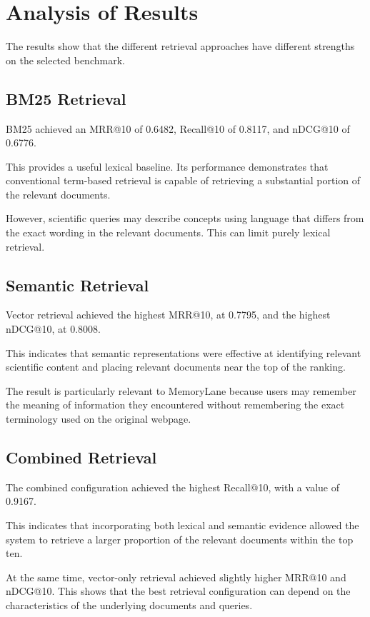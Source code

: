 \documentclass{tietreport}
\begin{document}
\section{Analysis of Results}

The results show that the different retrieval approaches have
different strengths on the selected benchmark.

\subsection{BM25 Retrieval}

BM25 achieved an MRR@10 of 0.6482, Recall@10 of 0.8117, and
nDCG@10 of 0.6776.

This provides a useful lexical baseline. Its performance
demonstrates that conventional term-based retrieval is capable
of retrieving a substantial portion of the relevant documents.

However, scientific queries may describe concepts using
language that differs from the exact wording in the relevant
documents. This can limit purely lexical retrieval.

\subsection{Semantic Retrieval}

Vector retrieval achieved the highest MRR@10, at 0.7795, and
the highest nDCG@10, at 0.8008.

This indicates that semantic representations were effective at
identifying relevant scientific content and placing relevant
documents near the top of the ranking.

The result is particularly relevant to MemoryLane because users
may remember the meaning of information they encountered without
remembering the exact terminology used on the original webpage.

\subsection{Combined Retrieval}

The combined configuration achieved the highest Recall@10,
with a value of 0.9167.

This indicates that incorporating both lexical and semantic
evidence allowed the system to retrieve a larger proportion of
the relevant documents within the top ten.

At the same time, vector-only retrieval achieved slightly higher
MRR@10 and nDCG@10. This shows that the best retrieval
configuration can depend on the characteristics of the
underlying documents and queries.
\end{document}
